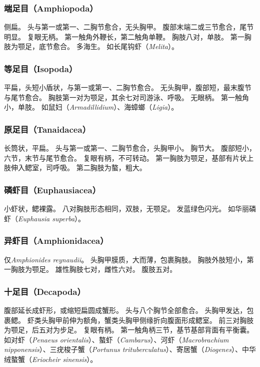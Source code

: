 \documentclass[11pt]{article}
\begin{document}
\subsubsection{端足目（Amphiopoda）}
侧扁。
头与第一或第一、二胸节愈合，无头胸甲。
腹部末端二或三节愈合，尾节明显。
复眼无柄。
第一触角外鞭长，第二触角单鞭。
胸肢八对，单肢。
第一胸肢为颚足，底节愈合。
多海生。
如长尾钩虾（\textit{Melita}）。

\subsubsection{等足目（Isopoda）}
平扁，头短小盾状，与第一或第一、二胸节愈合。
无头胸甲，腹部短，最末腹节与尾节愈合。
胸肢第一对为颚足，其余七对司游泳、呼吸。
无眼柄。
第一触角小，单肢。
如鼠妇（\textit{Armadillidium}）、海蟑螂（\textit{Ligia}）。

\subsubsection{原足目（Tanaidacea）}
长筒状，平扁。
头与第一或第一、二胸节愈合，头胸甲小。
胸节大。
腹部短小，六节，末节与尾节愈合。
复眼有柄，不可转动。
第一胸肢为颚足，基部有片状上肢伸入鳃室，司呼吸。
第二胸肢为螯，粗大。

\subsubsection{磷虾目（Euphausiacea）}
小虾状，鳃裸露。
八对胸肢形态相同，双肢，无颚足。
发蓝绿色闪光。
如华丽磷虾（\textit{Euphausia superba}）。

\subsubsection{异虾目（Amphionidacea）}
仅\textit{Amphionides reynaudii}。
头胸甲膜质，大而薄，包裹胸肢。
胸肢外肢短小，第一胸肢为颚足。
雄性胸肢七对，雌性六对。
腹肢五对。

\subsubsection{十足目（Decapoda）}
腹部延长成虾形，或缩短扁圆成蟹形。
头与八个胸节全部愈合。
头胸甲发达，包裹鳃。
虾类头胸甲前伸为额角，蟹类头胸甲侧缘折向腹面形成鳃室。
前三对胸肢为颚足，后五对为步足。
复眼有柄。
第一触角柄三节，基节基部背面有平衡囊。
如对虾（\textit{Penaeus orientalis}）、螯虾（\textit{Cambarus}）、河虾（\textit{Macrobrachium nipponensis}）、三疣梭子蟹（\textit{Portunus trituberculatus}）、寄居蟹（\textit{Diogenes}）、中华绒螯蟹（\textit{Eriocheir sinensis}）。
\end{document}
